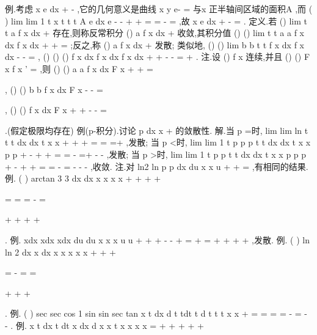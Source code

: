 \textcolor{lyred}{例}.考虑
x
e dx
+\infty 
-
\int 
,它的几何意义是曲线
x
y
e-
=
与x 正半轴间区域的面积A ,而 
(
)
lim
lim 1
t
x
t
t
t
A
e dx
e
-
-
\to +\infty 
\to +\infty 
=
=
-
=
\int 
,故
x
e dx
+\infty 
-
=
\int 
. 
\textcolor{lyred}{定义}.若
()
lim
t
t
a
f x dx
\to +\infty \int 
存在,则称\textcolor{lyred}{反常积分}
()
a
f x dx
+\infty 
\int 
\textcolor{lyred}{收敛},其积分值 
()
()
lim
t
t
a
a
f x dx
f x dx
+\infty 
\to +\infty 
=
\int 
\int 
;反之,称
()
a
f x dx
+\infty 
\int 
\textcolor{lyred}{发散}; 
类似地,
()
()
lim
b
b
t
t
f x dx
f x dx
\to -\infty 
-\infty 
=
\int 
\int 
,
()
()
()
f x dx
f x dx
f x dx
+\infty 
+\infty 
-\infty 
-\infty 
=
+
\int 
\int 
\int 
. 
\textcolor{lyred}{注}.设
()
f x 连续,并且
()
()
F
x
f x
'
=
,则
()
()
a
a
f x dx
F x
+\infty 
+\infty 
=



\int 
, 
()
()
b
b
f x dx
F x
-\infty 
-\infty 
=



\int 
,
()
()
f x dx
F x
+\infty 
+\infty 
-\infty 
-\infty 
=



\int 
.(假定极限均存在) 
\textcolor{lyred}{例(p-积分)}.讨论
p dx
x
+\infty 
\int 
的敛散性. 
解.当
p =时,
lim
lim ln
t
t
t
dx
dx
t
x
x
+\infty 
\to +\infty 
\to +\infty 
=
=
=+\infty 
\int 
\int 
,发散; 
当
p <时,
lim
lim 1
t
p
p
p
t
t
dx
dx
t
x
x
p
p
+\infty 
-
\to +\infty 
\to +\infty 
=
=
-
=+\infty 
-
-
\int 
\int 
,发散; 
当
p >时,
lim
lim 1
t
p
p
t
t
dx
dx
t
x
x
p
p
p
+\infty 
-
\to +\infty 
\to +\infty 
=
=
-
=
-
-
-
\int 
\int 
,收敛. 
\textcolor{lyred}{注}.对
ln2
ln p
p
dx
du
x
x
u
+\infty 
+\infty 
=
\int 
\int 
,有相同的结果. 
\textcolor{lyred}{例}.
(
)
arctan
3 3
dx
dx
x
x
x
x
\pi 
\pi 
\pi 
+\infty 
+\infty 
+\infty 
+


=
=
=
-
=


+
+
+
+


\int 
\int 
. 
\textcolor{lyred}{例}.
xdx
xdx
xdx
du
du
x
x
x
u
u
+\infty 
+\infty 
+\infty 
-\infty 
-\infty 
+\infty 
=
+
=
+
+
+
+
\int 
\int 
\int 
\int 
\int 
,发散. 
\textcolor{lyred}{例}.
(
)
ln
ln 2
dx
x
dx
x
x
x
x
x
+\infty 
+\infty 
+\infty 



=
-
=
=




+
+
+




\int 
\int 
. 
\textcolor{lyred}{例}.
(
)
sec
sec
cos
1 sin
sin
sec
tan
x
t
dx
d
t
tdt
t d
t
t
t
x
x
\pi 
\pi 
\pi 
\pi 
\pi 
\pi 
+\infty 
=
=
=
=
-
=
-
-
\int 
\int 
\int 
\int 
. 
\textcolor{lyred}{例}.
x t
dx
t dt
x dx
d x
x
t
x
x
x
x
=
+\infty 
+\infty 
+\infty 
+\infty 
+


